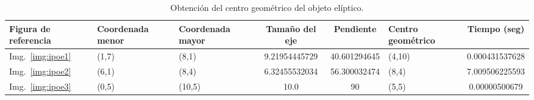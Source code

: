 \begin{table}[ht!]
	\centering
	\begin{tabular}{p{.6in}|p{.7in}|p{.7in}|c|c|p{.7in}|c}
		Figura de referencia & Coordenada menor & Coordenada mayor & Tamaño del eje & Pendiente & Centro geom\'etrico & Tiempo (seg) \\\hline\hline
		Img.~\ref{img:ipoe1} & (1,7) & (8,1)  & 9.21954445729 & 40.601294645 & (4,10) & 0.000431537628 \\\hline
		Img.~\ref{img:ipoe2} & (6,1) & (8,4)  & 6.32455532034 & 56.300032474 & (8,4)  & 7.009506225593 \\\hline
		Img.~\ref{img:ipoe3} & (0,5) & (10,5) & 10.0          & 90           & (5,5)  & 0.00000500679  \\
	\end{tabular}
	\caption{Obtención del centro geom\'etrico del objeto elíptico.}
	\label{tab:ocg}
\end{table}



